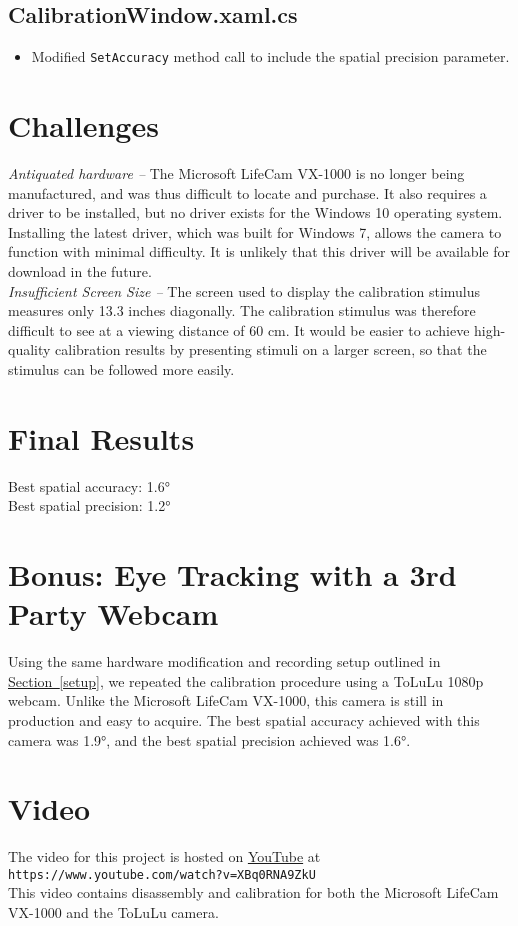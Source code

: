 \documentclass[11pt]{article}
\begin{document}
\subsection*{CalibrationWindow.xaml.cs}
    \begin{itemize}
        \item Modified \texttt{SetAccuracy} method call to include the spatial precision parameter.
    \end{itemize}

\section{Challenges}
\label{sec:challenges} %
\textit{Antiquated hardware -- }The Microsoft LifeCam VX-1000 is no longer being
manufactured, and was thus difficult to locate and purchase.
It also requires a driver to be installed, but no driver exists for the Windows
10 operating system.
Installing the latest driver, which was built for Windows 7, allows the camera
to function with minimal difficulty.
It is unlikely that this driver will be available for download in the future. \\

\textit{Insufficient Screen Size -- } The screen used to display the calibration
stimulus measures only 13.3 inches diagonally.
The calibration stimulus was therefore difficult to see at a viewing distance of
60 cm.
It would be easier to achieve high-quality calibration results by presenting
stimuli on a larger screen, so that the stimulus can be followed more easily.

\section{Final Results}
\label{sec:final-results} %
Best spatial accuracy: \ang{1.6} \\
Best spatial precision: \ang{1.2}

\section{Bonus: Eye Tracking with a 3rd Party Webcam}
\label{sec:bonus}
Using the same hardware modification and recording setup outlined in
\hyperref[setup]{Section~\ref{setup}}, we repeated the calibration procedure
using a ToLuLu 1080p webcam.
Unlike the Microsoft LifeCam VX-1000, this camera is still in production and
easy to acquire.
The best spatial accuracy achieved with this camera was \ang{1.9}, and the best
spatial precision achieved was \ang{1.6}.

\section{Video}
\label{sec:video}
The video for this project is hosted on
\href{https://www.youtube.com/watch?v=XBq0RNA9ZkU}{YouTube} at
\texttt{https://www.youtube.com/watch?v=XBq0RNA9ZkU} \\
This video contains disassembly and calibration for both the
Microsoft LifeCam VX-1000 and the ToLuLu camera.


\end{document}
